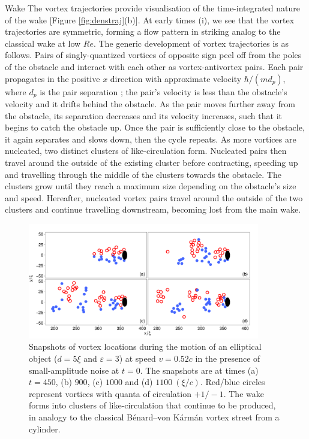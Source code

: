 \begin{chapter}{\label{cha:wake}Wake}
The vortex trajectories provide visualisation of the time-integrated nature of the wake  [Figure \ref{fig:denstraj}(b)].   At early times (i), we see that the vortex trajectories are symmetric, forming a flow pattern in striking analog to the classical wake at low $Re$.  The generic development of vortex trajectories is as follows.  Pairs of singly-quantized vortices of opposite sign peel off from the poles of the obstacle and interact with each other as vortex-antivortex pairs.  Each pair propagates in the positive $x$ direction with approximate velocity $\hbar/(md_p)$\cite{saito10}, where $d_p$ is the pair separation \cite{Donnelly};  the pair's velocity is less than the obstacle's velocity and it drifts behind the obstacle.  As the pair moves further away from the obstacle, its separation decreases and its velocity increases, such that it begins to catch the obstacle up.  Once the pair is sufficiently close to the obstacle, it again separates and slows down, then the cycle repeats.  As more vortices are nucleated, two distinct clusters of like-circulation form.  Nucleated pairs then travel around the outside of the existing cluster before contracting, speeding up and travelling through the middle of the clusters towards the obstacle.  The clusters grow until they reach a maximum size depending on the obstacle's size and speed.  Hereafter, nucleated vortex pairs travel around the outside of the two clusters and continue travelling downstream,  becoming lost from the main wake. 



 
\begin{figure}
\centering
\includegraphics[width=0.9\textwidth]{wake/figure3}
\caption{\label{fig:progress} Snapshots of vortex locations during the motion of an elliptical object ($d=5 \xi$ and $\varepsilon=3$) at speed $v=0.52c$ in the presence of small-amplitude noise at $t=0$.  The snapshots are at times (a) $t=450$, (b) $900$, (c) $1000$ and (d) $1100~(\xi/c)$.  Red/blue circles represent vortices with quanta of circulation $+1/-1$.  
The wake forms into clusters of like-circulation that continue to be produced, in analogy to the classical B\'enard--von K\'arm\'an vortex street from a cylinder.}
\end{figure}

\end{chapter}
